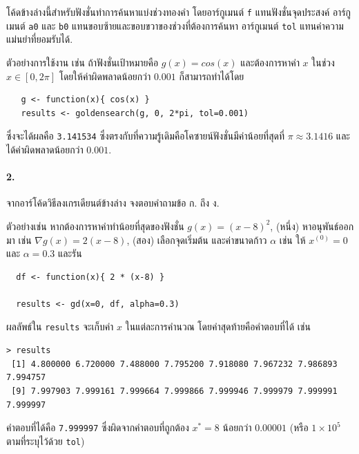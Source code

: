 โค้ดข้างล่างนี้สำหรับฟังชั่นทำการค้นหาแบ่งช่วงทองคำ 
โดยอาร์กูเมนต์ \texttt{f} แทนฟังชั่นจุดประสงค์
อาร์กูเมนต์ \texttt{a0} และ \texttt{b0} แทนขอบซ้ายและขอบขวาของช่วงที่ต้องการค้นหา
อาร์กูเมนต์ \texttt{tol} แทนค่าความแม่นยำที่ยอมรับได้.



ตัวอย่างการใช้งาน เช่น ถ้าฟังชั่นเป้าหมายคือ $g(x) = cos(x)$ และต้องการหาค่า $x$ ในช่วง $x \in [0, 2 \pi]$ โดยให้ค่าผิดพลาดน้อยกว่า $0.001$ ก็สามารถทำได้โดย
\begin{verbatim}
   g <- function(x){ cos(x) }
   results <- goldensearch(g, 0, 2*pi, tol=0.001)
\end{verbatim}
ซึ่งจะได้ผลคือ \texttt{3.141534} ซึ่งตรงกับที่ความรู้เดิมคือโคซายน์ฟังชั่นมีค่าน้อยที่สุดที่ $\pi \approx 3.1416$ และได้ค่าผิดพลาดน้อยกว่า $0.001$.

\paragraph{2.} จากอาร์โค้ดวิธีลงเกรเดียนต์ข้างล่าง จงตอบคำถามข้อ ก. ถึง ง.



ตัวอย่างเช่น หากต้องการหาค่าทำน้อยที่สุดของฟังชั่น $g(x) = (x-8)^2$, 
(หนึ่ง) หาอนุพันธ์ออกมา เช่น $\nabla g(x) = 2 (x - 8)$,
(สอง) เลือกจุดเริ่มต้น และค่าขนาดก้าว $\alpha$ เช่น ให้ $x^{(0)} = 0$ และ $\alpha = 0.3$
และรัน
\begin{verbatim}
  df <- function(x){ 2 * (x-8) }
  
  results <- gd(x=0, df, alpha=0.3)
\end{verbatim}
ผลลัพธ์ใน \texttt{results} จะเก็บค่า $x$ ในแต่ละการคำนวณ โดยค่าสุดท้ายคือคำตอบที่ได้ เช่น
\begin{verbatim}
> results
 [1] 4.800000 6.720000 7.488000 7.795200 7.918080 7.967232 7.986893 7.994757
 [9] 7.997903 7.999161 7.999664 7.999866 7.999946 7.999979 7.999991 7.999997
\end{verbatim}
คำตอบที่ได้คือ \texttt{7.999997} ซึ่งผิดจากคำตอบที่ถูกต้อง $x^* = 8$ น้อยกว่า $0.00001$ (หรือ $1\times10^5$ ตามที่ระบุไว้ด้วย \texttt{tol})

